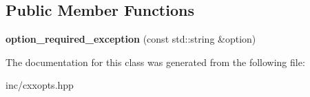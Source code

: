 \subsection*{Public Member Functions}
\begin{DoxyCompactItemize}
\item 
{\bfseries option\+\_\+required\+\_\+exception} (const std\+::string \&option)\hypertarget{classcxxopts_1_1option__required__exception_a0f7af231cec958b7912b0b010351584f}{}\label{classcxxopts_1_1option__required__exception_a0f7af231cec958b7912b0b010351584f}

\end{DoxyCompactItemize}


The documentation for this class was generated from the following file\+:\begin{DoxyCompactItemize}
\item 
inc/cxxopts.\+hpp\end{DoxyCompactItemize}
